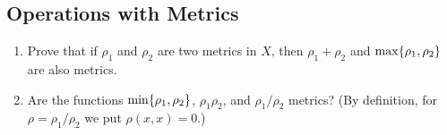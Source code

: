 \subsection{Operations with Metrics}
\begin{minorEx}
    \begin{enumerate}
        \item Prove that if $\rho_1$ and $\rho_2$ are two metrics in $X$, then
            $\rho_1 + \rho_2$ and $\max \{\rho_1, \rho_2\}$ are also metrics.
        \item Are the functions $\min\{\rho_1, \rho_2\}$, $\rho_1 \rho_2$, and
            $\rho_1 / \rho_2$ metrics? (By definition, for $\rho = \rho_1 /
            \rho_2$ we put $\rho(x, x) = 0$.)
    \end{enumerate}
\end{minorEx}

